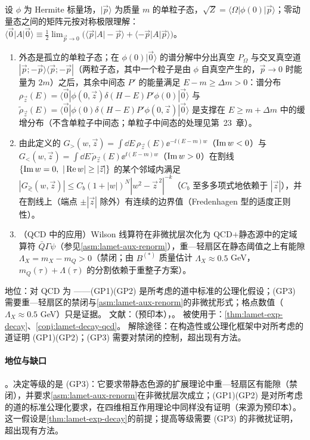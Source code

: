 \begin{assumption}\label{asm:lamet-gap}
设 $\phi$ 为 Hermite 标量场，$|\vec p\rangle$ 为质量 $m$ 的单粒子态，$\sqrt Z=\langle\Omega|\phi(0)|\vec p\rangle$；零动量态之间的矩阵元按对称极限理解：$\langle\vec 0|A|\vec 0\rangle\equiv\frac12\lim_{\vec p\to0}\big(\langle\vec p|A|-\vec p\rangle+\langle-\vec p|A|\vec p\rangle\big)$\cite[第~5.1~节]{Ji:2026vir}。
\begin{enumerate}[label=(GP\arabic*),leftmargin=3.2em,itemsep=1pt,topsep=2pt]
\item 外态是孤立的单粒子态；在 $\phi(0)|\vec 0\rangle$ 的谱分解中分出真空 $P_\Omega$ 与交叉真空道 $|\vec p;-\vec p\rangle\langle\vec p;-\vec p|$（两粒子态，其中一个粒子是由 $\phi$ 自真空产生的，$\vec p\to0$ 时能量为 $2m$）之后，其余中间态 $P'$ 的能量满足 $E-m\ge\Delta m>0$：谱分布 $\rho_{\vec z}(E)=\langle\vec 0|\phi(0,\vec z)\delta(H-E)P'\phi(0)|\vec 0\rangle$ 与 $\tilde\rho_{\vec z}(E)=\langle\vec 0|\phi(0)\delta(H-E)P'\phi(0,\vec z)|\vec 0\rangle$ 是支撑在 $E\ge m+\Delta m$ 中的缓增分布（不含单粒子中间态；单粒子中间态的处理见第~23~章）。
\item 由此定义的 $G_>(w,\vec z)=\int\dd E\,\rho_{\vec z}(E)\ee^{-\ii(E-m)w}$（$\operatorname{Im} w<0$）与 $G_<(w,\vec z)=\int\dd E\,\tilde\rho_{\vec z}(E)\ee^{\ii(E-m)w}$（$\operatorname{Im} w>0$）在割线 $\{\operatorname{Im} w=0,\ |\operatorname{Re} w|\ge|\vec z|\}$ 的某个邻域内满足 $|G_\gtrless(w,\vec z)|\le C_b(1+|w|)^N|w^2-\vec z^{\,2}|^{-k}$（$C_b$ 至多多项式地依赖于 $|\vec z|$），并在割线上（端点 $\pm|\vec z|$ 除外）有连续的边界值（Fredenhagen 型的适度正则性）。
\item （QCD 中的应用）Wilson 线算符在非微扰层次化为 QCD$+$静态源中的定域算符 $\bar Q\Gamma\psi$（参见\cref{asm:lamet-aux-renorm}），重—轻扇区在静态阈值之上有能隙 $\Lambda_X=m_X-m_Q>0$（禁闭；由 $B^{(*)}$ 质量估计 $\Lambda_X\approx0.5$ GeV，$m_Q(\tau)+\Lambda(\tau)$ 的分割依赖于重整子方案）。
\end{enumerate}
地位：对 QCD 为 \tagC——(GP1)(GP2) 是所考虑的道中标准的公理化假设；(GP3) 需要重—轻扇区的禁闭与\cref{asm:lamet-aux-renorm}的非微扰形式；格点数值（$\Lambda_X\approx0.5$ GeV）只是证据。
文献：\cite[第~5~节]{Ji:2026vir}（预印本），\cite{Fredenhagen:1984bz}。
被使用于：\cref{thm:lamet-exp-decay}、\cref{conj:lamet-decay-qcd}。
解除途径：在构造性或公理化框架中对所考虑的道证明 (GP1)(GP2)；(GP3) 需要对禁闭的控制，超出现有方法。
\end{assumption}

\paragraph{地位与缺口}
\tagC。决定等级的是 (GP3)：它要求带静态色源的扩展理论中重—轻扇区有能隙（禁闭），并要求\cref{asm:lamet-aux-renorm}在非微扰层次成立；(GP1)(GP2) 是对所考虑的道的标准公理化要求，在四维相互作用理论中同样没有证明（来源\cite[第~5~节]{Ji:2026vir}为预印本）。这一假设是\cref{thm:lamet-exp-decay}的前提；提高等级需要 (GP3) 的非微扰证明，超出现有方法。

